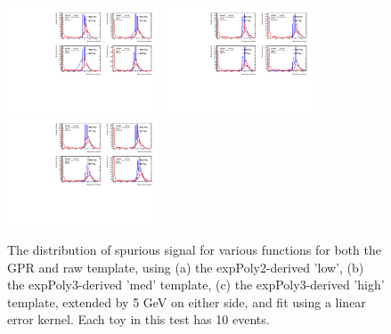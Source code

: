 \begin{figure} 
\begin{center}
  \includegraphics[width=0.4\textwidth]{figures/background/gpr/validation/linear/ToyTest_FitSigVals_lowpT_10_noSig}   
  \includegraphics[width=0.4\textwidth]{figures/background/gpr/validation/linear/ToyTest_FitSigVals_medpT_10_noSig}   
  \includegraphics[width=0.4\textwidth]{figures/background/gpr/validation/linear/ToyTest_FitSigVals_highpT_10_noSig}   
\caption{The distribution of spurious signal for various functions for both the GPR and raw template, using (a) the expPoly2-derived 'low', (b) the expPoly3-derived 'med' template, (c) the expPoly3-derived 'high' template, extended by 5 GeV on either side, and fit using a linear error kernel. Each toy in this test has 10 events.}
\label{fig:linearkernel_lowpt_10_noSig}
\end{center}
\end{figure}

